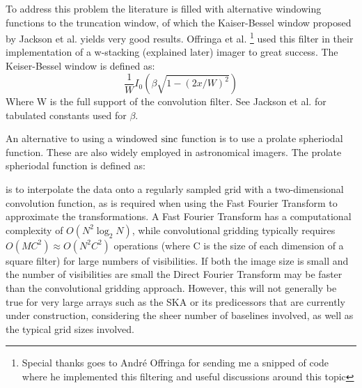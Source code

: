 To address this problem the literature is filled with alternative windowing functions to the truncation window, of which 
 the Kaiser-Bessel window proposed by Jackson et al. \cite{jackson1991selection} yields very good results. 
 Offringa et al. \cite{offringa2014wsclean}\footnote{Special thanks goes to Andr\'e Offringa for sending me a snipped of code
 where he implemented this filtering and useful discussions around this topic} used this filter in their implementation of a 
 w-stacking (explained later) imager to great success. The Keiser-Bessel window is defined as:
 \begin{equation}
  \frac{1}{W}I_0(\beta\sqrt{1-(2x/W)^2})
 \end{equation}
 Where W is the full support of the convolution filter. See Jackson et al.\cite{jackson1991selection} for tabulated constants used 
 for $\beta$.

 An alternative to using a windowed $\operatorname*{sinc}$ function is to use a prolate spheriodal function. These are also widely employed in 
 astronomical imagers. The prolate spheriodal function is defined as:
%   

 
 is to interpolate the data onto a regularly sampled grid with a two-dimensional convolution function, as is required when using the Fast Fourier Transform to approximate the transformations. A Fast Fourier Transform has a computational complexity of $O(N^2\log_2{N})$, while
 convolutional gridding typically requires $O(MC^2) \approx O(N^2C^2)$ operations (where C is the size of each dimension of a square filter) for large numbers of visibilities. If both the image size is small and the number of visibilities 
 are small the Direct Fourier Transform may be faster than the convolutional gridding approach. However, this will not generally be true for very large arrays such as the SKA or its predicessors that are currently under construction, 
 considering the sheer number of baselines involved, as well as the typical grid sizes involved. 
 
